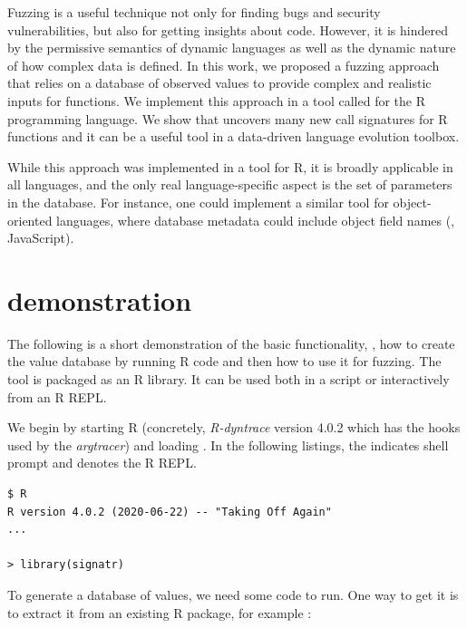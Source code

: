 \documentclass[sigplan,nonacm,anonymous,review]{acmart}
\begin{document}
Fuzzing is a useful technique not only for finding bugs and security vulnerabilities, but also for getting insights about code.
However, it is hindered by the permissive semantics of dynamic languages as well as the dynamic nature of how complex data is defined.
In this work, we proposed a fuzzing approach that relies on a database of observed values to provide complex and realistic inputs for functions.
We implement this approach in a tool called \tool for the R programming language.
We show that \tool uncovers many new call signatures for R functions and it can be a useful tool in a data-driven language evolution toolbox.

While this approach was implemented in a tool for R, it is broadly applicable in all languages, and the only real language-specific aspect is the set of parameters in the database.
For instance, one could implement a similar tool for object-oriented languages, where database metadata could include object field names (\Eg, JavaScript).




\appendix

\section{\tool demonstration}\label{sec:demo}

\lstset{
    basicstyle=\scriptsize\ttfamily,
    numbers=none,
}

The following is a short demonstration of the basic \tool functionality, \Ie, how to create the value database by running R code and then how to use it for fuzzing.
The tool is packaged as an R library.
It can be used both in a script or interactively from an R REPL.

We begin by starting R (concretely, \emph{R-dyntrace} version 4.0.2 which has the hooks used by the \emph{argtracer}) and loading \tool.
In the following listings, the \code{\$} indicates shell prompt and \code{>} denotes the R REPL.

\begin{lstlisting}
$ R
R version 4.0.2 (2020-06-22) -- "Taking Off Again"
...

> library(signatr)
\end{lstlisting}

To generate a database of values, we need some code to run.
One way to get it is to extract it from an existing R package, for example :
\end{document}

